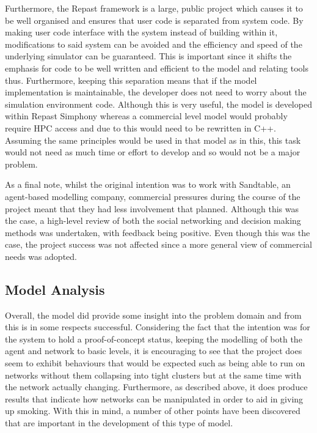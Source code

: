 \documentclass[]{report}
\begin{document}
Furthermore, the Repast framework is a large, public project which causes it to be well organised and ensures that user code is separated from system code. By making user code interface with the system instead of building within it, modifications to said system can be avoided and the efficiency and speed of the underlying simulator can be guaranteed. This is important since it shifts the emphasis for code to be well written and efficient to the model and relating tools thus. Furthermore, keeping this separation means that if the model implementation is maintainable, the developer does not need to worry about the simulation environment code. Although this is very useful, the model is developed within Repast Simphony whereas a commercial level model would probably require HPC access and due to this would need to be rewritten in C++. Assuming the same principles would be used in that model as in this, this task would not need as much time or effort to develop and so would not be a major problem.

As a final note, whilst the original intention was to work with Sandtable, an agent-based modelling company, commercial pressures during the course of the project meant that they had less involvement that planned. Although this was the case, a high-level review of both the social networking and decision making methods was undertaken, with feedback being positive. Even though this was the case, the project success was not affected since a more general view of commercial needs was adopted.

\subsection{Model Analysis}
Overall, the model did provide some insight into the problem domain and from this is in some respects successful. Considering the fact that the intention was for the system to hold a proof-of-concept status, keeping the modelling of both the agent and network to basic levels, it is encouraging to see that the project does seem to exhibit behaviours that would be expected such as being able to run on networks without them collapsing into tight clusters but at the same time with the network actually changing. Furthermore, as described above, it does produce results that indicate how networks can be manipulated in order to aid in giving up smoking. With this in mind, a number of other points have been discovered that are important in the development of this type of model.
\end{document}

